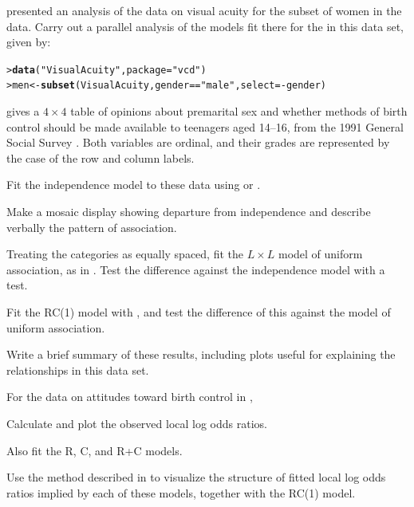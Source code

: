 \documentclass[11pt]{report}\usepackage[]{graphicx}\usepackage[]{color}
\makeatletter
\newcommand{\hlstr}[1]{\textcolor[rgb]{0.192,0.494,0.8}{#1}}%
\newcommand{\hlopt}[1]{\textcolor[rgb]{0,0,0}{#1}}%
\newcommand{\hlstd}[1]{\textcolor[rgb]{0.345,0.345,0.345}{#1}}%
\newcommand{\hlkwb}[1]{\textcolor[rgb]{0.69,0.353,0.396}{#1}}%
\newcommand{\hlkwc}[1]{\textcolor[rgb]{0.333,0.667,0.333}{#1}}%
\newcommand{\hlkwd}[1]{\textcolor[rgb]{0.737,0.353,0.396}{\textbf{#1}}}%
\newenvironment{kframe}{%
 \def\at@end@of@kframe{}%
 \ifinner\ifhmode%
  \def\at@end@of@kframe{\end{minipage}}%
  \begin{minipage}{\columnwidth}%
 \fi\fi%
 \def\FrameCommand##1{\hskip\@totalleftmargin \hskip-\fboxsep
 \colorbox{shadecolor}{##1}\hskip-\fboxsep
     \hskip-\linewidth \hskip-\@totalleftmargin \hskip\columnwidth}%
 \MakeFramed {\advance\hsize-\width
   \@totalleftmargin\z@ \linewidth\hsize
   \@setminipage}}%
 {\par\unskip\endMakeFramed%
 \at@end@of@kframe}
\newenvironment{knitrout}{}{} %
\renewenvironment{knitrout}{\small\renewcommand{\baselinestretch}{.85}}{} %
\makeatother
\begin{document}
\begin{Exercises}

  \exercise {} presented an analysis of the data on visual acuity 
  for the subset of women in the  data.  Carry out a parallel
  analysis of the models fit there for the  in this data set, given by:
\begin{knitrout}
\color{fgcolor}\begin{kframe}
\begin{alltt}
\hlstd{> }\hlkwd{data}\hlstd{(}\hlstr{"VisualAcuity"}\hlstd{,} \hlkwc{package}\hlstd{=}\hlstr{"vcd"}\hlstd{)}
\hlstd{> }\hlstd{men} \hlkwb{<-} \hlkwd{subset}\hlstd{(VisualAcuity, gender}\hlopt{==}\hlstr{"male"}\hlstd{,} \hlkwc{select}\hlstd{=}\hlopt{-}\hlstd{gender)}
\end{alltt}
\end{kframe}
\end{knitrout}


  \exercise {} gives a $4 \times 4$ table of opinions about
  premarital sex and whether methods of birth control should be made available
  to teenagers aged 14--16, from the 1991 General Social Survey
  \citep[Table 10.3]{Agresti:2013}.  Both variables are ordinal, and their
  grades are represented by the case of the row and column labels.


  \begin{enumerate*}
    \item Fit the independence model to these data using  or .
    \item Make a mosaic display showing departure from independence and describe
    verbally the pattern of association.
    \item Treating the categories as equally spaced, fit the $L \times L$ model
    of uniform association, as in .  Test the
    difference against the independence model with a \LR test.
    \item Fit the RC(1) model with , and test the difference of
    this against the model of uniform association.
    \item Write a brief summary of these results, including plots useful
    for explaining the relationships in this data set.
  \end{enumerate*}
  
  \exercise For the data on attitudes toward birth control in ,
  \begin{enumerate*}
    \item Calculate and plot the observed local log odds ratios.
    \item Also fit the R, C, and R+C models.
    \item Use the method described in 
          to visualize the structure of fitted local log odds ratios implied by each of these models,
          together with the RC(1) model.  
  \end{enumerate*}
  

\end{Exercises}
\end{document}
